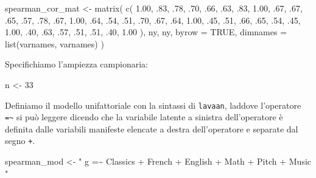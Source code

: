 \documentclass[
  11pt,
]{krantz}
\makeatletter
\newenvironment{Shaded}{\begin{snugshade}}{\end{snugshade}}
\newcommand{\AttributeTok}[1]{\textcolor[rgb]{0.61,0.61,0.61}{#1}}
\newcommand{\ConstantTok}[1]{\textcolor[rgb]{0,0,0}{#1}}
\newcommand{\DecValTok}[1]{\textcolor[rgb]{0.06,0.06,0.06}{#1}}
\newcommand{\FloatTok}[1]{\textcolor[rgb]{0.06,0.06,0.06}{#1}}
\newcommand{\FunctionTok}[1]{\textcolor[rgb]{0,0,0}{#1}}
\newcommand{\NormalTok}[1]{#1}
\newcommand{\OtherTok}[1]{\textcolor[rgb]{0.37,0.37,0.37}{#1}}
\newcommand{\StringTok}[1]{\textcolor[rgb]{0.5,0.5,0.5}{#1}}
\newenvironment{kframe}{%
\medskip{}
\setlength{\fboxsep}{.8em}
 \def\at@end@of@kframe{}%
 \ifinner\ifhmode%
  \def\at@end@of@kframe{\end{minipage}}%
  \begin{minipage}{\columnwidth}%
 \fi\fi%
 \def\FrameCommand##1{\hskip\@totalleftmargin \hskip-\fboxsep
 \colorbox{shadecolor}{##1}\hskip-\fboxsep
     \hskip-\linewidth \hskip-\@totalleftmargin \hskip\columnwidth}%
 \MakeFramed {\advance\hsize-\width
   \@totalleftmargin\z@ \linewidth\hsize
   \@setminipage}}%
 {\par\unskip\endMakeFramed%
 \at@end@of@kframe}
\renewenvironment{Shaded}{\begin{kframe}}{\end{kframe}}
\theoremstyle{definition}
\theoremstyle{definition}
\theoremstyle{definition}
\theoremstyle{definition}
\theoremstyle{remark}
\makeatother
\begin{document}
\begin{Shaded}
\begin{Highlighting}[]
\NormalTok{spearman\_cor\_mat }\OtherTok{\textless{}{-}} \FunctionTok{matrix}\NormalTok{(}
  \FunctionTok{c}\NormalTok{(}
    \FloatTok{1.00}\NormalTok{, .}\DecValTok{83}\NormalTok{, .}\DecValTok{78}\NormalTok{, .}\DecValTok{70}\NormalTok{, .}\DecValTok{66}\NormalTok{, .}\DecValTok{63}\NormalTok{,}
\NormalTok{    .}\DecValTok{83}\NormalTok{, }\FloatTok{1.00}\NormalTok{, .}\DecValTok{67}\NormalTok{, .}\DecValTok{67}\NormalTok{, .}\DecValTok{65}\NormalTok{, .}\DecValTok{57}\NormalTok{,}
\NormalTok{    .}\DecValTok{78}\NormalTok{, .}\DecValTok{67}\NormalTok{, }\FloatTok{1.00}\NormalTok{, .}\DecValTok{64}\NormalTok{, .}\DecValTok{54}\NormalTok{, .}\DecValTok{51}\NormalTok{,}
\NormalTok{    .}\DecValTok{70}\NormalTok{, .}\DecValTok{67}\NormalTok{, .}\DecValTok{64}\NormalTok{, }\FloatTok{1.00}\NormalTok{, .}\DecValTok{45}\NormalTok{, .}\DecValTok{51}\NormalTok{,}
\NormalTok{    .}\DecValTok{66}\NormalTok{, .}\DecValTok{65}\NormalTok{, .}\DecValTok{54}\NormalTok{, .}\DecValTok{45}\NormalTok{, }\FloatTok{1.00}\NormalTok{, .}\DecValTok{40}\NormalTok{,}
\NormalTok{    .}\DecValTok{63}\NormalTok{, .}\DecValTok{57}\NormalTok{, .}\DecValTok{51}\NormalTok{, .}\DecValTok{51}\NormalTok{, .}\DecValTok{40}\NormalTok{, }\FloatTok{1.00}
\NormalTok{  ),}
\NormalTok{  ny, ny,}
  \AttributeTok{byrow =} \ConstantTok{TRUE}\NormalTok{,}
  \AttributeTok{dimnames =} \FunctionTok{list}\NormalTok{(varnames, varnames)}
\NormalTok{)}
\end{Highlighting}
\end{Shaded}

Specifichiamo l'ampiezza campionaria:

\begin{Shaded}
\begin{Highlighting}[]
\NormalTok{n }\OtherTok{\textless{}{-}} \DecValTok{33}
\end{Highlighting}
\end{Shaded}

Definiamo il modello unifattoriale con la sintassi di \texttt{lavaan}, laddove l'operatore \texttt{=\textasciitilde{}} si può leggere dicendo che la variabile latente a sinistra dell'operatore è definita dalle variabili manifeste elencate a destra dell'operatore e separate dal segno \texttt{+}.

\begin{Shaded}
\begin{Highlighting}[]
\NormalTok{spearman\_mod }\OtherTok{\textless{}{-}} \StringTok{"}
\StringTok{  g =\textasciitilde{} Classics + French + English + Math + Pitch + Music}
\StringTok{"}
\end{Highlighting}
\end{Shaded}
\end{document}

